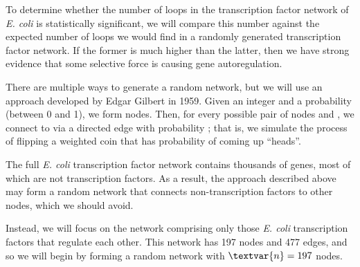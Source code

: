  \begin{qbox}\end{qbox}

To determine whether the number of loops in the transcription factor network of \textit{E. coli} is statistically significant, we will compare this number against the expected number of loops we would find in a randomly generated transcription factor network. If the former is much higher than the latter, then we have strong evidence that some selective force is causing gene autoregulation.

There are multiple ways to generate a random network, but we will use an approach developed by Edgar Gilbert in 1959. Given an integer  and a probability  (between 0 and 1), we form  nodes. Then, for every possible pair of nodes  and , we connect  to  via a directed edge with probability ; that is, we simulate the process of flipping a weighted coin that has probability  of coming up ``heads''.\\

\begin{note}\end{note}

\begin{qbox}\end{qbox}

The full \textit{E. coli} transcription factor network contains thousands of genes, most of which are not transcription factors. As a result, the approach described above may form a random network that connects non-transcription factors to other nodes, which we should avoid.

Instead, we will focus on the network comprising only those \textit{E. coli} transcription factors that regulate each other. This network has 197 nodes and 477 edges, and so we will begin by forming a random network with $\textvar{n} = 197$ nodes.

